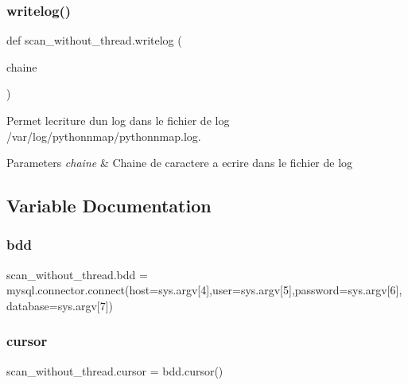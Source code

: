 \subsubsection{\texorpdfstring{writelog()}{writelog()}}
{\footnotesize\ttfamily def scan\+\_\+without\+\_\+thread.\+writelog (\begin{DoxyParamCaption}\item[{}]{chaine }\end{DoxyParamCaption})}



Permet l\textquotesingle{}ecriture d\textquotesingle{}un log dans le fichier de log /var/log/pythonnmap/pythonnmap.log. 


\begin{DoxyParams}{Parameters}
{\em chaine} & Chaine de caractere a ecrire dans le fichier de log \\
\hline
\end{DoxyParams}


\subsection{Variable Documentation}
\hypertarget{namespacescan__without__thread_a0ff689283457b0b6f98fb047fe65e3f9}{}\label{namespacescan__without__thread_a0ff689283457b0b6f98fb047fe65e3f9} 
\subsubsection{\texorpdfstring{bdd}{bdd}}
{\footnotesize\ttfamily scan\+\_\+without\+\_\+thread.\+bdd = mysql.\+connector.\+connect(host=sys.\+argv\mbox{[}4\mbox{]},user=sys.\+argv\mbox{[}5\mbox{]},password=sys.\+argv\mbox{[}6\mbox{]}, database=sys.\+argv\mbox{[}7\mbox{]})}

\hypertarget{namespacescan__without__thread_ab96035c23ecba59ad9570c46c57b7aa0}{}\label{namespacescan__without__thread_ab96035c23ecba59ad9570c46c57b7aa0} 
\subsubsection{\texorpdfstring{cursor}{cursor}}
{\footnotesize\ttfamily scan\+\_\+without\+\_\+thread.\+cursor = bdd.\+cursor()}

